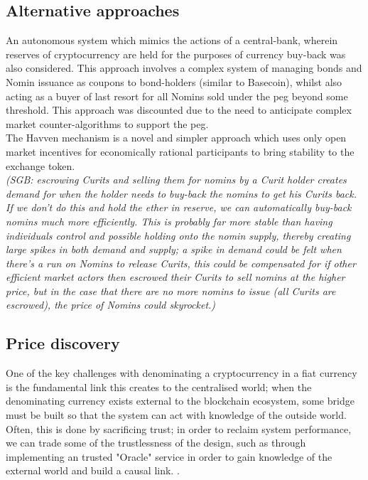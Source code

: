 \documentclass{article}
\begin{document}
\subsection{Alternative approaches}

\noindent An autonomous system which mimics the actions of a central-bank, wherein reserves of cryptocurrency are held for the purposes of currency buy-back was also considered. This approach involves a complex system of managing bonds and Nomin issuance as coupons to bond-holders (similar to Basecoin), whilst also acting as a buyer of last resort for all Nomins sold under the peg beyond some threshold. This approach was discounted due to the need to anticipate complex market counter-algorithms to support the peg. \\

\noindent The Havven mechanism is a novel and simpler approach which uses only open market incentives for economically rational participants to bring stability to the exchange token. \\

\textit{(SGB: escrowing Curits and selling them for nomins by a Curit holder creates demand for when the holder needs to buy-back the nomins to get his Curits back. If we don't do this and hold the ether in reserve, we can automatically buy-back nomins much more efficiently. This is probably far more stable than having individuals control and possible holding onto the nomin supply, thereby creating large spikes in both demand and supply; a spike in demand could be felt when there's a run on Nomins to release Curits, this could be compensated for if other efficient market actors then escrowed their Curits to sell nomins at the higher price, but in the case that there are no more nomins to issue (all Curits are escrowed), the price of Nomins could skyrocket.)}

\subsection{Price discovery}

One of the key challenges with denominating a cryptocurrency in a fiat currency is the fundamental link this creates to the centralised world; when the denominating currency exists external to the blockchain ecosystem, some bridge must be built so that the system can act with knowledge of the outside world. Often, this is done by sacrificing trust; in order to reclaim system performance, we can trade some of the trustlessness of the design, such as through implementing an trusted "Oracle" service in order to gain knowledge of the external world and build a causal link. \cite{brooks2017blog}.\\
\end{document}
